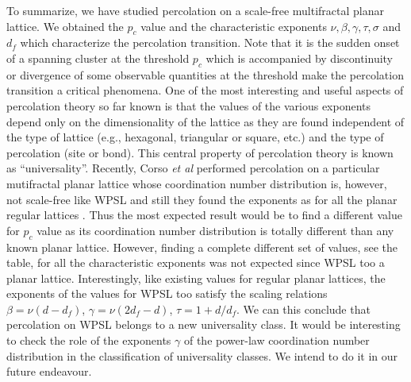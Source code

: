 \documentclass[twocolumn,showpacs,preprintnumbers,amsmath,amssymb]{article}
\begin{document}
To summarize, we have studied percolation on a scale-free multifractal planar lattice. We obtained the $p_c$ value and
the characteristic exponents $\nu, \beta,\gamma, \tau, \sigma$ and $d_f$ which characterize the percolation transition.  
Note that it is the sudden onset of a spanning cluster at the threshold $p_c$ which is 
accompanied by discontinuity or divergence of 
some observable quantities at the threshold make the percolation transition a critical phenomena. One of the most interesting and useful
aspects of percolation theory so far known is that the values of the various exponents depend only on the dimensionality of the 
lattice as they are found independent of
the type of lattice (e.g., hexagonal, triangular or square, etc.) and the type of percolation (site or
bond).  This central property of percolation theory is known as “universality”. 
Recently, Corso {\it et al} performed percolation on 
a particular mutifractal planar lattice whose coordination number distribution is, however, not scale-free like
WPSL and still they found the exponents as for all the planar regular lattices \cite{ref.multifractal}. 
Thus the most expected result would be to find a different value for $p_c$ value as its coordination number
distribution is totally different than any known planar lattice. However, finding
a complete different set of values, see the table, for all the characteristic exponents was not expected since WPSL too a planar
lattice. Interestingly, like existing values for regular planar lattices, the exponents of the values for WPSL too satisfy the scaling relations $\beta=\nu(d- d_f)$, $\gamma=\nu(2d_f-d)$, $\tau=1+d/d_f$. 
We can this conclude that percolation on WPSL belongs to a new universality class. 
It would be interesting to check the role of the exponents $\gamma$ of the power-law coordination number distribution in the classification of universality classes. We intend to do it in our future endeavour.
\end{document}
